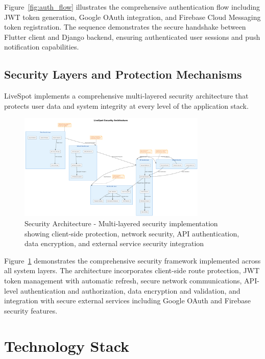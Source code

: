 Figure~\ref{fig:auth_flow} illustrates the comprehensive authentication flow including JWT token generation, Google OAuth integration, and Firebase Cloud Messaging token registration. The sequence demonstrates the secure handshake between Flutter client and Django backend, ensuring authenticated user sessions and push notification capabilities.
\clearpage
\subsection{Security Layers and Protection Mechanisms}

LiveSpot implements a comprehensive multi-layered security architecture that protects user data and system integrity at every level of the application stack.

\begin{figure}[h!]
    \centering
    \includegraphics[width=0.8\textwidth]{figures/security_architecture}
    \caption{Security Architecture - Multi-layered security implementation showing client-side protection, network security, API authentication, data encryption, and external service security integration}
    \label{fig:security_architecture}
\end{figure}

Figure~\ref{fig:security_architecture} demonstrates the comprehensive security framework implemented across all system layers. The architecture incorporates client-side route protection, JWT token management with automatic refresh, secure network communications, API-level authentication and authorization, data encryption and validation, and integration with secure external services including Google OAuth and Firebase security features.

\section{Technology Stack}
\label{sec:technology_stack}

